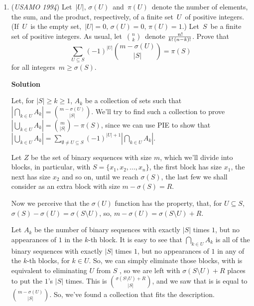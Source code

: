 \begin{enumerate}
 \textbf{USAMO 1994/4:}

 Consider $a_j$. Notice that $\sqrt j-\sqrt{j-1}=\frac{j-(j-1)}{\sqrt j+\sqrt{j-1}}=\frac1{\sqrt j+\sqrt{j-1}}$. Squaring, $(\sqrt j-\sqrt{j-1})^2=\frac1{(\sqrt j+\sqrt{j-1})^2}$. Also, $\sqrt j+\sqrt{j-1}<2\sqrt j$ is trivial by $\sqrt{j-1}<\sqrt j$ hence $(\sqrt j+\sqrt{j-1})^2<4j$. Also, $(\sqrt j-\sqrt{j-1})^2=\frac1{(\sqrt j+\sqrt{j-1})^2}$ and thus $\frac1{(\sqrt j+\sqrt{j-1})^2}>\frac1{4j}$. Therefore, $(\sqrt j-\sqrt{j-1})^2>\frac1{4j}$. Taking the sum 1 through $n$ gives the desired result. $\square$



	\item (\textit{USAMO 1994}) Let $\, |U|, \, \sigma(U) \,$ and $\, \pi(U) \,$ denote the number of elements, the sum, and the product, respectively, of a finite set $\, U \,$ of positive integers.  (If $\, U \,$ is the empty set, $\, |U| = 0, \, \sigma(U) = 0, \, \pi(U) = 1$.) Let $\, S \,$ be a finite set of positive integers. As usual, let $\, \binom{n}{k} \,$ denote $\, n! \over k! \, (n-k)!$. Prove that 
 \[\sum_{U \subseteq S} (-1)^{|U|} \binom{m - \sigma(U)}{|S|} = \pi(S)\] for all integers $\, m \geq \sigma(S)$.


 



\textbf{Solution}

Let, for $|S|\geq k \geq 1$, $A_k$ be a collection of sets such that $\left|\bigcap_{k \in U}A_k\right| = \binom{m- \sigma(U)}{|S|}$. We'll try to find such a collection to prove $\left|\bigcup_{k \in U}A_k\right| = \binom{m}{|S|}-\pi(S)$, since we can use PIE to show that $\left|\bigcup_{k \in U}A_k\right| = \sum_{\emptyset \neq U \subseteq S} (-1)^{|U|+1}\left|\bigcap_{k \in U}A_k\right|$.

 Let $Z$ be the set of binary sequences with size $m$, which we'll divide into blocks, in particular, with $S=\{x_1, x_2, ..., x_n\}$, the first block has size $x_1$, the next has size $x_2$ and so on, until we reach $\sigma(S)$, the last few we shall consider as an extra block with size $m-\sigma(S)=R$. 

 Now we perceive that the $\sigma(U)$ function has the property, that, for $U \subseteq S$, $\sigma(S)-\sigma(U)= \sigma(S\setminus U)$, so, $m- \sigma(U)= \sigma(S\setminus U)+R$.

 Let $A_k$ be the number of binary sequences with exactly $|S|$ times $1$, but no appearances of $1$ in the $k$-th block. It is easy to see that $\bigcap_{k \in U}A_k$ is all of the binary sequences with exactly $|S|$ times $1$, but no appearances of $1$ in any of the $k$-th blocks, for $k \in U$. So, we can simply eliminate those blocks, with is equivalent to eliminating $U$ from $S$ , so we are left with $\sigma(S\setminus U)+R$ places to put the $1$'s $|S|$ times. This is $\binom{\sigma(S\setminus U)+R}{|S|}$, and we saw that is is equal to $\binom{m- \sigma(U)}{|S|}$. So, we've found a collection that fits the description.


\end{enumerate}
